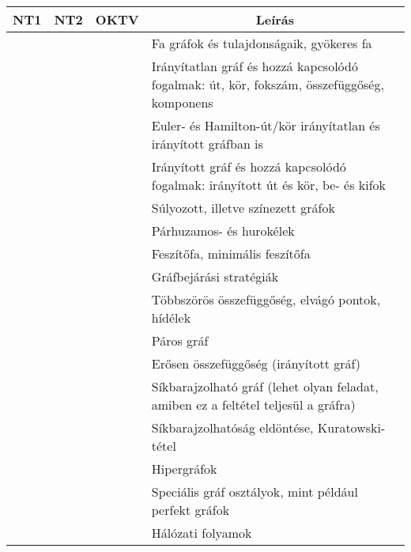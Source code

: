 \documentclass[a4paper,11pt,oneside]{article}
\newcommand{\cmark}{\ding{51}}%
\newcommand{\xmark}{\ding{55}}%
\newcommand{\cincl}{{\small\cmark}}
\newcommand{\cdefi}{{\small\cmark\faFileTextO}}
\newcommand{\ccode}{{\small\cmark\faFileText}}
\newcommand{\cemay}{{\small\xmark\faQuestionCircle}}
\newcommand{\cexcl}{{\small\xmark}}
\newcommand{\ctable}[1]{
    \begin{center}
        \begin{longtable}{ | C | C | C | m{8cm} | } %
        \hline
        \textbf{NT1} & \textbf{NT2} & \textbf{OKTV} & \multicolumn{1}{|c|}{\textbf{Leírás}} \\ \hline
        \endhead
        #1
        \end{longtable}
    \end{center}
}
\begin{document}
\ctable{
    \ccode & \cdefi & \cincl & Fa gráfok és tulajdonságaik, gyökeres fa
    \\ \hline  %
    \ccode & \ccode & \cdefi & Irányítatlan gráf és hozzá kapcsolódó fogalmak:
    út, kör, fokszám, összefüggőség, komponens
    \\ \hline  %
    \cexcl & \ccode & \ccode & Euler- és Hamilton-út/kör irányítatlan és irányított gráfban is
    \\ \hline  %
    \ccode & \ccode & \ccode & Irányított gráf és hozzá kapcsolódó fogalmak:
    irányított út és kör, be- és kifok
    \\ \hline  %
    \cexcl & \cdefi & \cdefi & Súlyozott, illetve színezett gráfok
    \\ \hline  %
    \ccode & \cdefi & \cdefi & Párhuzamos- és hurokélek
    \\ \hline  %
    \cexcl & \cdefi & \cdefi & Feszítőfa, minimális feszítőfa 
    \\ \hline  %
    \cexcl & \cdefi & \cdefi & Gráfbejárási stratégiák
    \\ \hline  %
    \cexcl & \cemay & \ccode & Többszörös összefüggőség, elvágó pontok, hídélek
    \\ \hline  %
    \cexcl & \cdefi & \cdefi & Páros gráf
    \\ \hline  %
    \cexcl & \cemay & \ccode & Erősen összefüggőség (irányított gráf)
    \\ \hline  %
    \cexcl & \ccode & \ccode & Síkbarajzolható gráf (lehet olyan feladat, amiben ez a feltétel teljesül a gráfra)
    \\ \hline  %
    \cexcl & \cexcl & \cexcl & Síkbarajzolhatóság eldöntése, Kuratowski-tétel
    \\ \hline  %
    \cexcl & \cexcl & \cexcl & Hipergráfok
    \\ \hline  %
    \cexcl & \cexcl & \cexcl & Speciális gráf osztályok, mint például perfekt gráfok
    \\ \hline  %
    \cexcl & \cexcl & \cemay & Hálózati folyamok
    \\ \hline  %
}
\end{document}
